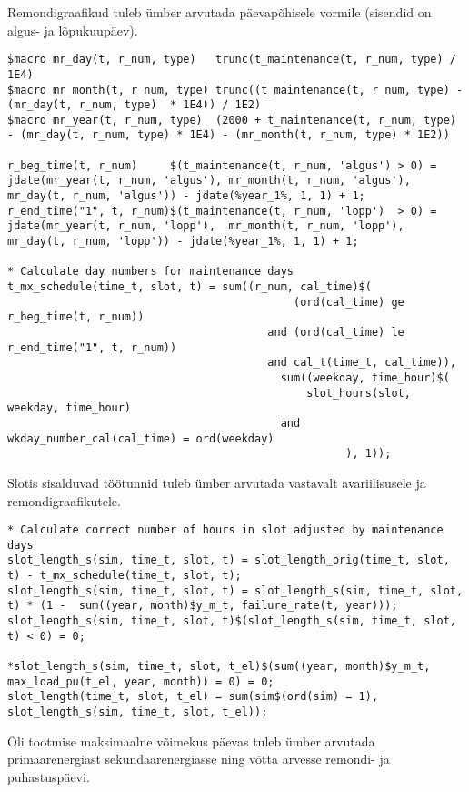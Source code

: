 Remondigraafikud tuleb ümber arvutada päevapõhisele vormile (sisendid on algus- ja lõpukuupäev).
\begin{verbatim}
$macro mr_day(t, r_num, type)   trunc(t_maintenance(t, r_num, type) / 1E4)
$macro mr_month(t, r_num, type) trunc((t_maintenance(t, r_num, type) - (mr_day(t, r_num, type)  * 1E4)) / 1E2)
$macro mr_year(t, r_num, type)  (2000 + t_maintenance(t, r_num, type) - (mr_day(t, r_num, type) * 1E4) - (mr_month(t, r_num, type) * 1E2))

r_beg_time(t, r_num)     $(t_maintenance(t, r_num, 'algus') > 0) = jdate(mr_year(t, r_num, 'algus'), mr_month(t, r_num, 'algus'), mr_day(t, r_num, 'algus')) - jdate(%year_1%, 1, 1) + 1;
r_end_time("1", t, r_num)$(t_maintenance(t, r_num, 'lopp')  > 0) = jdate(mr_year(t, r_num, 'lopp'),  mr_month(t, r_num, 'lopp'), mr_day(t, r_num, 'lopp')) - jdate(%year_1%, 1, 1) + 1;

* Calculate day numbers for maintenance days
t_mx_schedule(time_t, slot, t) = sum((r_num, cal_time)$(
                                            (ord(cal_time) ge r_beg_time(t, r_num))
                                        and (ord(cal_time) le r_end_time("1", t, r_num))
                                        and cal_t(time_t, cal_time)),
                                          sum((weekday, time_hour)$(
                                              slot_hours(slot, weekday, time_hour)
                                          and wkday_number_cal(cal_time) = ord(weekday)
                                                    ), 1));
\end{verbatim}

Slotis sisalduvad töötunnid tuleb ümber arvutada vastavalt avariilisusele ja remondigraafikutele.
\begin{verbatim}
* Calculate correct number of hours in slot adjusted by maintenance days
slot_length_s(sim, time_t, slot, t) = slot_length_orig(time_t, slot, t) - t_mx_schedule(time_t, slot, t);
slot_length_s(sim, time_t, slot, t) = slot_length_s(sim, time_t, slot, t) * (1 -  sum((year, month)$y_m_t, failure_rate(t, year)));
slot_length_s(sim, time_t, slot, t)$(slot_length_s(sim, time_t, slot, t) < 0) = 0;

*slot_length_s(sim, time_t, slot, t_el)$(sum((year, month)$y_m_t, max_load_pu(t_el, year, month)) = 0) = 0;
slot_length(time_t, slot, t_el) = sum(sim$(ord(sim) = 1), slot_length_s(sim, time_t, slot, t_el));
\end{verbatim}

Õli tootmise maksimaalne võimekus päevas tuleb ümber arvutada primaarenergiast sekundaarenergiasse ning võtta arvesse remondi- ja puhastuspäevi.

